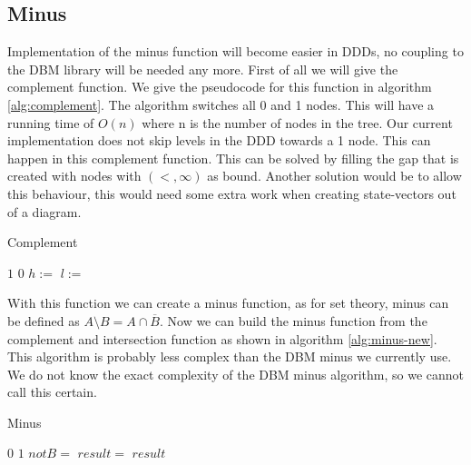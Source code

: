 \subsection{Minus}
Implementation of the minus function will become easier in DDDs, no coupling to the DBM library will be needed any more. First of all we will give the complement function. We give the pseudocode for this function in algorithm \ref{alg:complement}. The algorithm switches all 0 and 1 nodes. This will have a running time of $O(n)$ where n is the number of nodes in the tree. Our current implementation does not skip levels in the DDD towards a 1 node. This can happen in this complement function. This can be solved by filling the gap that is created with nodes with $(<,\infty)$ as bound. Another solution would be to allow this behaviour, this would need some extra work when creating state-vectors out of a diagram.

\begin{algorithm}
\caption{Complement}\label{alg:complement}
\begin{algorithmic}[1]
		\State \Return $1$
	\EndIf
		\State \Return $0$
	\EndIf
	\State $h :=$ 
	\State $l :=$ 
	\State \Return {}
	
\EndProcedure	
\end{algorithmic}
\end{algorithm}

With this function we can create a minus function, as for set theory, minus can be defined as $A \setminus B = A \cap \overline{B}$. Now we can build the minus function from the complement and intersection function as shown in algorithm \ref{alg:minus-new}. This algorithm is probably less complex than the DBM minus we currently use. We do not know the exact complexity of the DBM minus algorithm, so we cannot call this certain.

\begin{algorithm}
\caption{Minus}\label{alg:minus-new}
\begin{algorithmic}[1]
		\State \Return $0$
	\EndIf
		\State \Return $1$
	\EndIf
	\State $notB = $
	\State $result =$ 
	\State \Return $result$
	
\EndProcedure	
\end{algorithmic}
\end{algorithm}
